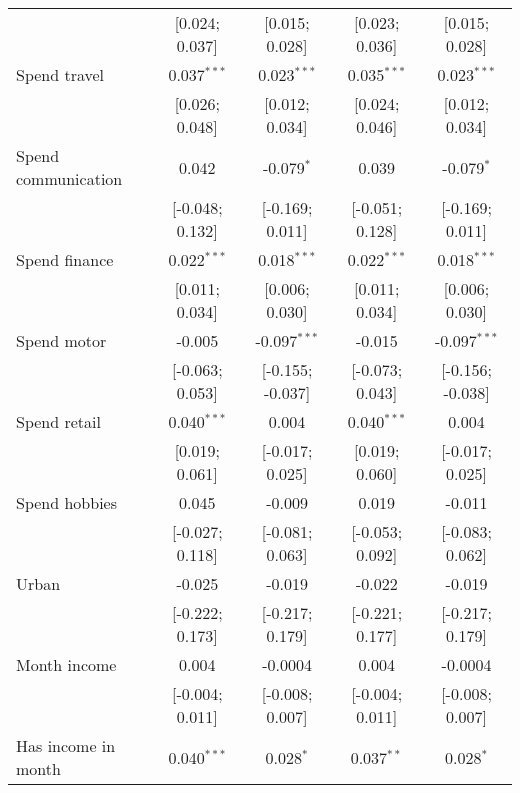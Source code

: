 \begin{table}[htbp]
\begin{threeparttable}[b]
\begin{tabular}{lcccc}
                                  & [0.024; 0.037]    & [0.015; 0.028]   & [0.023; 0.036]   & [0.015; 0.028]\\   
         Spend travel             & 0.037$^{***}$     & 0.023$^{***}$    & 0.035$^{***}$    & 0.023$^{***}$\\   
                                  & [0.026; 0.048]    & [0.012; 0.034]   & [0.024; 0.046]   & [0.012; 0.034]\\   
         Spend communication      & 0.042             & -0.079$^{*}$     & 0.039            & -0.079$^{*}$\\   
                                  & [-0.048; 0.132]   & [-0.169; 0.011]  & [-0.051; 0.128]  & [-0.169; 0.011]\\   
         Spend finance            & 0.022$^{***}$     & 0.018$^{***}$    & 0.022$^{***}$    & 0.018$^{***}$\\   
                                  & [0.011; 0.034]    & [0.006; 0.030]   & [0.011; 0.034]   & [0.006; 0.030]\\   
         Spend motor              & -0.005            & -0.097$^{***}$   & -0.015           & -0.097$^{***}$\\   
                                  & [-0.063; 0.053]   & [-0.155; -0.037] & [-0.073; 0.043]  & [-0.156; -0.038]\\   
         Spend retail             & 0.040$^{***}$     & 0.004            & 0.040$^{***}$    & 0.004\\   
                                  & [0.019; 0.061]    & [-0.017; 0.025]  & [0.019; 0.060]   & [-0.017; 0.025]\\   
         Spend hobbies            & 0.045             & -0.009           & 0.019            & -0.011\\   
                                  & [-0.027; 0.118]   & [-0.081; 0.063]  & [-0.053; 0.092]  & [-0.083; 0.062]\\   
         Urban                    & -0.025            & -0.019           & -0.022           & -0.019\\   
                                  & [-0.222; 0.173]   & [-0.217; 0.179]  & [-0.221; 0.177]  & [-0.217; 0.179]\\   
         Month income             & 0.004             & -0.0004          & 0.004            & -0.0004\\   
                                  & [-0.004; 0.011]   & [-0.008; 0.007]  & [-0.004; 0.011]  & [-0.008; 0.007]\\   
         Has income in month      & 0.040$^{***}$     & 0.028$^{*}$      & 0.037$^{**}$     & 0.028$^{*}$\\   

\end{tabular}
\end{threeparttable}
\end{table}
